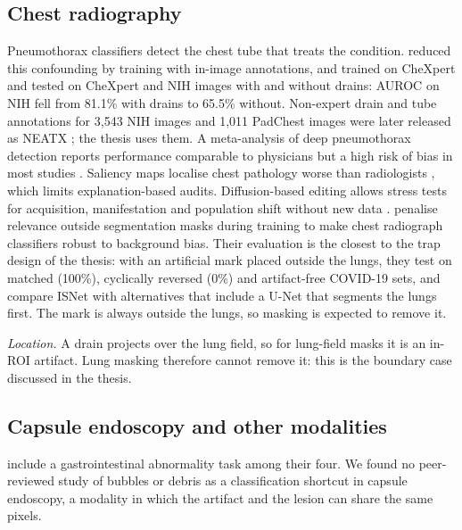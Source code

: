 \documentclass[11pt,a4paper]{article}
\begin{document}
\subsection{Chest radiography}
Pneumothorax classifiers detect the chest tube that treats the condition. \citet{rueckel2021pneumothorax} reduced this
confounding by training with in-image annotations, and \citet{jimenez2023shortcuts} trained on
CheXpert and tested on CheXpert and NIH images with and without drains: AUROC on NIH fell from 81.1\% with drains to
65.5\% without. Non-expert drain and tube annotations for 3,543 NIH images and 1,011 PadChest images were later
released as NEATX \citep{cheplygina2025neatx}; the thesis uses them. A meta-analysis of deep pneumothorax detection reports performance
comparable to physicians but a high risk of bias in most studies \citep{sugibayashi2023pneumothorax}. Saliency maps
localise chest pathology worse than radiologists \citep{saporta2022saliency}, which limits explanation-based audits.
Diffusion-based editing allows stress tests for acquisition, manifestation and population shift without new data
\citep{perezgarcia2024radedit}. \citet{bassi2024isnet} penalise relevance outside segmentation masks during training to make chest
radiograph classifiers robust to background bias. Their evaluation is the closest to the trap design of the thesis:
with an artificial mark placed outside the lungs, they test on matched (100\%), cyclically reversed (0\%) and
artifact-free COVID-19 sets, and compare ISNet with alternatives that include a U-Net that segments the lungs first.
The mark is always outside the lungs, so masking is expected to remove it.

\emph{Location.} A drain projects over the lung field, so for lung-field masks it is an in-ROI artifact. Lung
masking therefore cannot remove it: this is the boundary case discussed in the thesis.

\subsection{Capsule endoscopy and other modalities}
\citet{pahde2025ensuring} include a gastrointestinal abnormality task among their four. We found no peer-reviewed study
of bubbles or debris as a classification shortcut in capsule endoscopy, a modality in which the artifact and the lesion
can share the same pixels.
\end{document}
